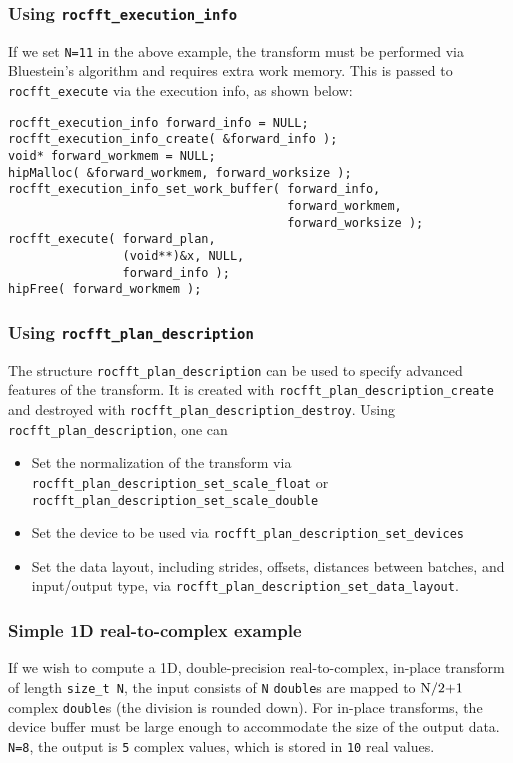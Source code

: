 \documentclass[10pt]{article}
\renewcommand{\(}{\left(}
\renewcommand{\)}{\right)}
\begin{document}
\subsubsection{Using \lstinline{rocfft_execution_info}}
If we set \lstinline{N=11} in the above example, the transform
must be performed via Bluestein's algorithm and requires extra work
memory.  This is passed to \lstinline{rocfft_execute} via the
execution info, as shown below:
\begin{lstlisting}
rocfft_execution_info forward_info = NULL;
rocfft_execution_info_create( &forward_info );
void* forward_workmem = NULL;
hipMalloc( &forward_workmem, forward_worksize );
rocfft_execution_info_set_work_buffer( forward_info,
                                       forward_workmem,
                                       forward_worksize );
rocfft_execute( forward_plan,
                (void**)&x, NULL,
                forward_info );
hipFree( forward_workmem );
\end{lstlisting}

\subsubsection{Using \lstinline{rocfft_plan_description}}

The structure \lstinline{rocfft_plan_description} can be used to
specify advanced features of the transform.  It is created with
\lstinline{rocfft_plan_description_create} and destroyed with
\lstinline{rocfft_plan_description_destroy}.  Using
\lstinline{rocfft_plan_description}, one can
\begin{itemize}
\item Set the normalization of the transform via
  \lstinline{rocfft_plan_description_set_scale_float} or
  \lstinline{rocfft_plan_description_set_scale_double}
\item Set the device to be used via
  \lstinline{rocfft_plan_description_set_devices}
\item Set the data layout, including strides, offsets, distances
  between batches, and input/output type, via
  \lstinline{rocfft_plan_description_set_data_layout}.
\end{itemize}

\subsubsection{Simple 1D real-to-complex example}
If we wish to compute a 1D, double-precision real-to-complex, in-place
transform of length \lstinline{size_t N}, the input consists of
\lstinline{N} \lstinline{double}s are mapped to
$\text{\lstinline{N/2+1}}$ complex \lstinline{double}s (the division
is rounded down).  For in-place transforms, the device buffer must be
large enough to accommodate the size of the output
data. \lstinline{N=8}, the output is \lstinline{5} complex
values, which is stored in \lstinline{10} real values.
\end{document}
